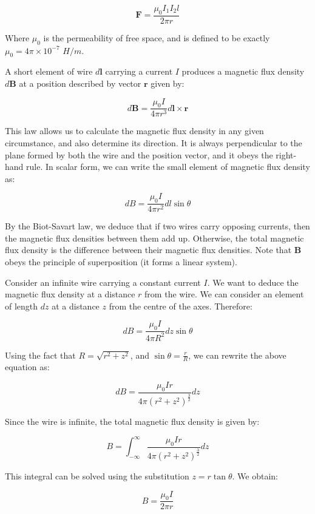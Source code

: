 \documentclass{article}
\begin{document}
\[ \mathbf{F} = \frac{\mu_0I_1I_2l}{2\pi r} \]

Where $\mu_0$ is the permeability of free space, and is defined to be exactly $\mu_0 = 4\pi \times 10^{-7}$ $H/m$.

\begin{theorem}
    A short element of wire $d\mathbf{l}$ carrying a current $I$ produces a magnetic flux density $d\mathbf{B}$ at a position described by vector $\mathbf{r}$ given by:

    \[ d\mathbf{B} = \frac{\mu_0I}{4\pi r^3} d\mathbf{l} \times \mathbf{r} \]
\end{theorem}

This law allows us to calculate the magnetic flux density in any given circumstance, and also determine its direction. It is always perpendicular to the plane formed by both the wire and the position vector, and it obeys the right-hand rule.
In scalar form, we can write the small element of magnetic flux density as:

\[ dB = \frac{\mu_0I}{4\pi r^2} dl\sin{\theta} \]

By the Biot-Savart law, we deduce that if two wires carry opposing currents, then the magnetic flux densities between them add up. Otherwise, the total magnetic flux density is the difference between their magnetic flux densities. Note that $\mathbf{B}$ obeys the principle of superposition (it forms a linear system).

\begin{example}
    Consider an infinite wire carrying a constant current $I$. We want to deduce the magnetic flux density at a distance $r$ from the wire. We can consider an element of length $dz$ at a distance $z$ from the centre of the axes. Therefore:

    \[ dB = \frac{\mu_0I}{4\pi R^2}dz \sin{\theta} \]

    Using the fact that $R = \sqrt{r^2 + z^2}$, and $\sin{\theta} = \frac{r}{R}$, we can rewrite the above equation as:

    \[ dB = \frac{\mu_0Ir}{4\pi \left(r^2 + z^2\right)^{\frac{3}{2}}}dz \]

    Since the wire is infinite, the total magnetic flux density is given by:

    \[ B = \int_{-\infty}^{\infty} \frac{\mu_0Ir}{4\pi \left(r^2 + z^2\right)^{\frac{3}{2}}}dz \]

    This integral can be solved using the substitution $z = r\tan{\theta}$. We obtain:

    \[ B = \frac{\mu_0I}{2\pi r} \]
\end{example}
\end{document}
